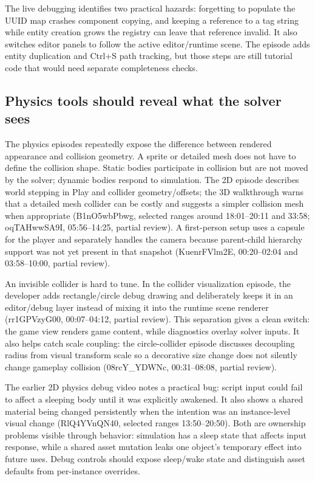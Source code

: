 The live debugging identifies two practical hazards: forgetting to populate the UUID map crashes component copying, and keeping a reference to a tag string while entity creation grows the registry can leave that reference invalid. It also switches editor panels to follow the active editor/runtime scene. The episode adds entity duplication and Ctrl+S path tracking, but those steps are still tutorial code that would need separate completeness checks.

\subsection{Physics tools should reveal what the solver sees}\label{06-engine-ii-ch033-physics-tools-should-reveal-what-the-solver-sees}

\hypertarget{06-engine-ii-ch033-physics-tools-should-reveal-what-the-solver-sees}{}

The physics episodes repeatedly expose the difference between rendered appearance and collision geometry. A sprite or detailed mesh does not have to define the collision shape. Static bodies participate in collision but are not moved by the solver; dynamic bodies respond to simulation. The 2D episode describes world stepping in Play and collider geometry/offsets; the 3D walkthrough warns that a detailed mesh collider can be costly and suggests a simpler collision mesh when appropriate (B1nO5wbPbwg, selected ranges around 18:01--20:11 and 33:58; oqTAHwwSA9I, 05:56--14:25, partial review). A first-person setup uses a capsule for the player and separately handles the camera because parent-child hierarchy support was not yet present in that snapshot (KuenrFVlm2E, 00:20--02:04 and 03:58--10:00, partial review).

An invisible collider is hard to tune. In the collider visualization episode, the developer adds rectangle/circle debug drawing and deliberately keeps it in an editor/debug layer instead of mixing it into the runtime scene renderer (rr1GPVzyG00, 00:07--04:12, partial review). This separation gives a clean switch: the game view renders game content, while diagnostics overlay solver inputs. It also helps catch scale coupling: the circle-collider episode discusses decoupling radius from visual transform scale so a decorative size change does not silently change gameplay collision (08rcY\_YDWNc, 00:31--08:08, partial review).

The earlier 2D physics debug video notes a practical bug: script input could fail to affect a sleeping body until it was explicitly awakened. It also shows a shared material being changed persistently when the intention was an instance-level visual change (RlQ4YVnQN40, selected ranges 13:50--20:50). Both are ownership problems visible through behavior: simulation has a sleep state that affects input response, while a shared asset mutation leaks one object's temporary effect into future uses. Debug controls should expose sleep/wake state and distinguish asset defaults from per-instance overrides.

